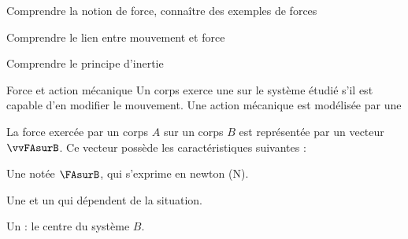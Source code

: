 \teteSndMouv




\begin{objectifs}
  \item Comprendre la notion de force, connaître des exemples de forces
  \item Comprendre le lien entre mouvement et force
  \item Comprendre le principe d'inertie
\end{objectifs}
\bigskip


\begin{doc}{Force et action mécanique}
  \label{doc:action_force_comp}
  \chevron Un corps exerce une  sur le système étudié s’il est capable d’en modifier le mouvement.
  Une action mécanique est modélisée par une 

  \begin{encart}
    La force exercée par un corps $A$ sur un corps $B$ est représentée par un vecteur $\vvFAsurB$.
    Ce vecteur possède les caractéristiques suivantes :
    \begin{listePoints}
      \item Une  notée $\FAsurB$, qui s'exprime en newton (N).
      \item Une  et un  qui dépendent de la situation.
      \item Un  : le centre du système $B$.
    \end{listePoints}
  \end{encart}
\end{doc}
\bigskip

